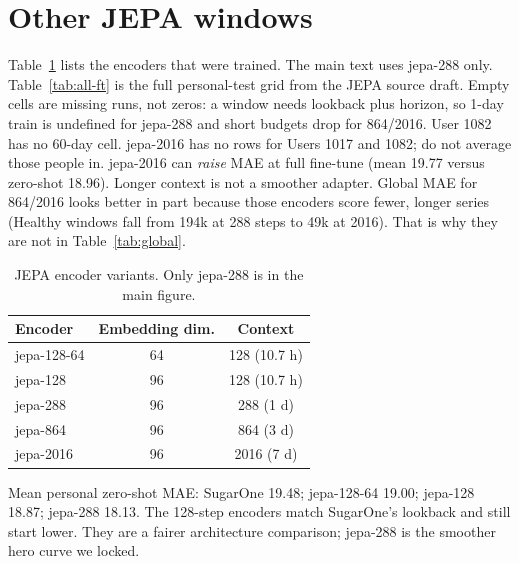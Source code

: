 \documentclass[11pt,a4paper]{article}
\begin{document}
\section{Other JEPA windows}
\label{app:windows}

Table~\ref{tab:encoders} lists the encoders that were trained. The main text
uses jepa-288 only. Table~\ref{tab:all-ft} is the full personal-test grid
from the JEPA source draft. Empty cells are missing runs, not zeros: a
window needs lookback plus horizon, so 1-day train is undefined for
jepa-288 and short budgets drop for 864/2016. User 1082 has no 60-day cell.
jepa-2016 has no rows for Users 1017 and 1082; do not average those people
in. jepa-2016 can \emph{raise} MAE at full fine-tune (mean 19.77 versus
zero-shot 18.96). Longer context is not a smoother adapter. Global MAE for
864/2016 looks better in part because those encoders score fewer, longer
series (Healthy windows fall from 194k at 288 steps to 49k at 2016). That
is why they are not in Table~\ref{tab:global}.

\begin{table}[h]
\centering
\small
\begin{tabular}{lcc}
\toprule
Encoder & Embedding dim. & Context \\
\midrule
jepa-128-64 & 64 & 128 (10.7 h) \\
jepa-128 & 96 & 128 (10.7 h) \\
jepa-288 & 96 & 288 (1 d) \\
jepa-864 & 96 & 864 (3 d) \\
jepa-2016 & 96 & 2016 (7 d) \\
\bottomrule
\end{tabular}
\caption{JEPA encoder variants. Only jepa-288 is in the main figure.}
\label{tab:encoders}
\end{table}

Mean personal zero-shot MAE: SugarOne 19.48; jepa-128-64 19.00; jepa-128
18.87; jepa-288 18.13. The 128-step encoders match SugarOne's lookback and
still start lower. They are a fairer architecture comparison; jepa-288 is
the smoother hero curve we locked.
\end{document}
